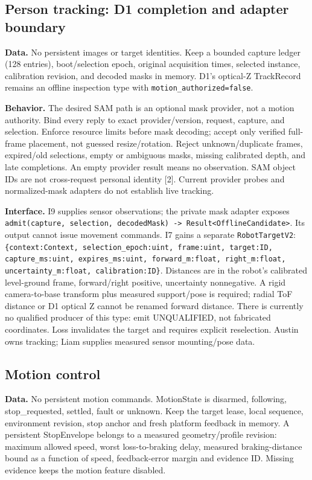 \documentclass[12pt,letterpaper]{article}
\newcommand{\field}[1]{\texttt{#1}}
\begin{document}
\subsection*{Person tracking: D1 completion and adapter boundary}
\textbf{Data.} No persistent images or target identities. Keep a bounded capture ledger (128 entries), boot/selection epoch, original acquisition times, selected instance, calibration revision, and decoded masks in memory. D1's optical-Z TrackRecord remains an offline inspection type with \field{motion\_\allowbreak{}authorized=false}.

\textbf{Behavior.} The desired SAM path is an optional mask provider, not a motion authority. Bind every reply to exact provider/version, request, capture, and selection. Enforce resource limits before mask decoding; accept only verified full-frame placement, not guessed resize/rotation. Reject unknown/duplicate frames, expired/old selections, empty or ambiguous masks, missing calibrated depth, and late completions. An empty provider result means no observation. SAM object IDs are not cross-request personal identity [2]. Current provider probes and normalized-mask adapters do not establish live tracking.

\textbf{Interface.} I9 supplies sensor observations; the private mask adapter exposes \field{admit(capture, selection, decodedMask) -> Result<OfflineCandidate>}. Its output cannot issue movement commands. I7 gains a separate \field{RobotTargetV2}: \field{\{context:Context, selection\_\allowbreak{}epoch:uint, frame:uint, target:ID, capture\_\allowbreak{}ms:uint, expires\_\allowbreak{}ms:uint, forward\_\allowbreak{}m:float, right\_\allowbreak{}m:float, uncertainty\_\allowbreak{}m:float, calibration:ID\}}. Distances are in the robot's calibrated level-ground frame, forward/right positive, uncertainty nonnegative. A rigid camera-to-base transform plus measured support/pose is required; radial ToF distance or D1 optical Z cannot be renamed forward distance. There is currently no qualified producer of this type: emit UNQUALIFIED, not fabricated coordinates. Loss invalidates the target and requires explicit reselection. Austin owns tracking; Liam supplies measured sensor mounting/pose data.

\subsection*{Motion control}
\textbf{Data.} No persistent motion commands. MotionState is disarmed, following, stop\_\allowbreak{}requested, settled, fault or unknown. Keep the target lease, local sequence, environment revision, stop anchor and fresh platform feedback in memory. A persistent StopEnvelope belongs to a measured geometry/profile revision: maximum allowed speed, worst loss-to-braking delay, measured braking-distance bound as a function of speed, feedback-error margin and evidence ID. Missing evidence keeps the motion feature disabled.
\end{document}
